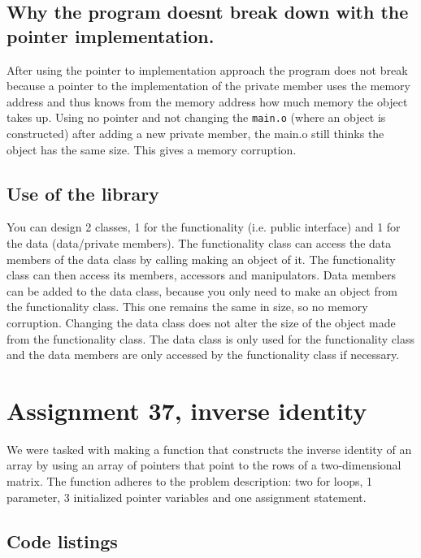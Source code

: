 \documentclass[11pt]{article}
\begin{document}
\subsection*{Why the program doesnt break down with the pointer implementation.}
After using the pointer to implementation approach the program does not break because a pointer to the implementation of the private member uses the memory address and thus knows from the memory address how much memory the object takes up. Using no pointer and not changing the \texttt{main.o} (where an object is constructed) after adding a new private member, the main.o still thinks the object has the same size. This gives a memory corruption.

\subsection*{Use of the library}
You can design 2 classes, 1 for the functionality (i.e. public interface) and 1 for the data (data/private members). The functionality class can access the data members of the data class by calling making an object of it. The functionality class can then access its members, accessors and manipulators. Data members can be added to the data class, because you only need to make an object from the functionality class. This one remains the same in size, so no memory corruption. Changing the data class does not alter the size of the object made from the functionality class. The data class is only used for the functionality class and the data members are only accessed by the functionality class if necessary.

\section*{Assignment 37, inverse identity}
We were tasked with making a function that constructs the inverse identity of an array by using an array of pointers that point to the rows of a two-dimensional matrix. The function adheres to the problem description: two for loops, 1 parameter, 3 initialized pointer variables and one assignment statement.

\subsection*{Code listings}

\end{document}

